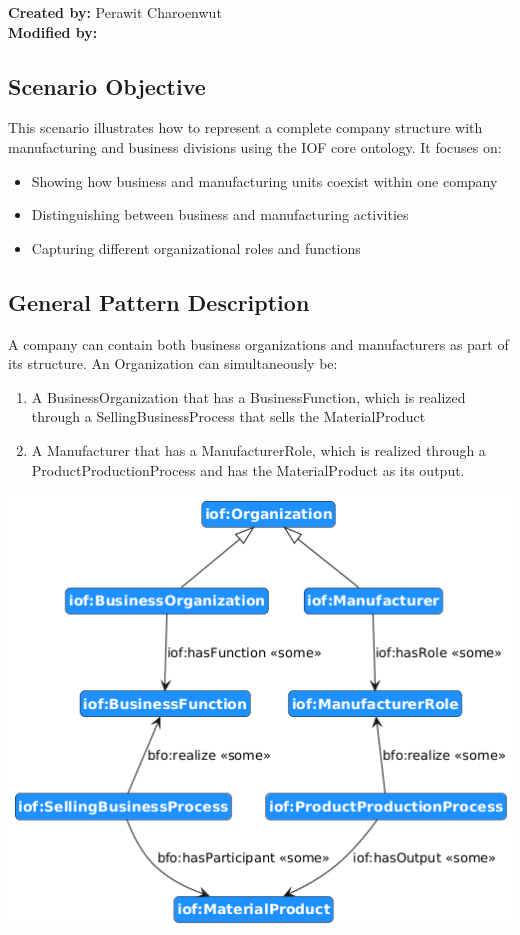 \label{chapter-scenario-template}
\textbf{Created by:} Perawit Charoenwut \\
\textbf{Modified by:}

\subsection*{Scenario Objective}
This scenario illustrates how to represent a complete company structure with manufacturing and business divisions using the IOF core ontology. It focuses on:
\begin{itemize}
    \item Showing how business and manufacturing units coexist within one company
    \item Distinguishing between business and manufacturing activities
    \item Capturing different organizational roles and functions
\end{itemize}

\subsection*{General Pattern Description}
A company can contain both business organizations and manufacturers as part of its structure.
An Organization can simultaneously be:
\begin{enumerate}
    \item A BusinessOrganization that has a BusinessFunction, which is realized through a SellingBusinessProcess that sells the MaterialProduct
    \item A Manufacturer that has a ManufacturerRole, which is realized through a ProductProductionProcess and  has the MaterialProduct as its output.
\end{enumerate}

\includegraphics[scale=0.6]{scenarios/different-type-organizations/image/different-type-organizations-schema}

